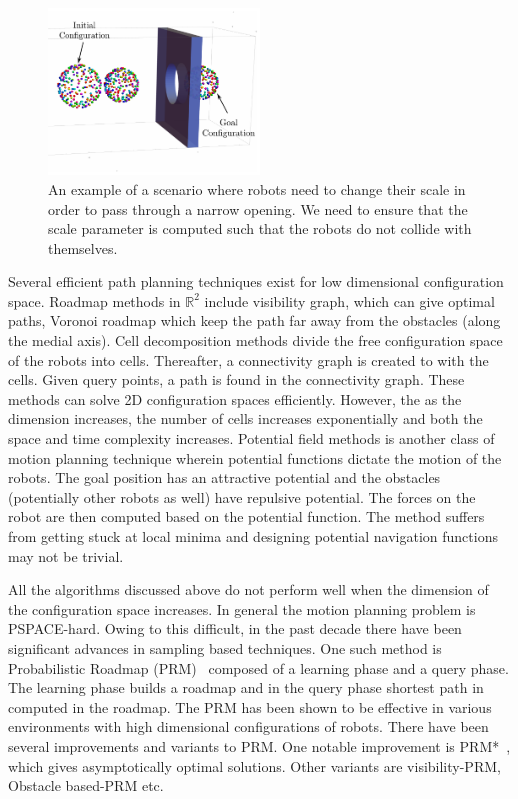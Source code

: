 \documentclass[12pt,a4paper, onecolumn]{IEEEtran}
\begin{document}
\begin{figure}[htbp]
  \centering
  \includegraphics[width=0.5\textwidth]{r200_all}
  \caption{An example of a scenario where robots need to change their scale in order to
  pass through a narrow opening. We need to ensure that the scale parameter is computed
  such that the robots do not collide with
themselves.}
  \label{fig:r200}
\end{figure}


Several efficient path planning techniques exist for low dimensional configuration space. Roadmap methods in $\mathbb R^2$ include visibility graph, which can give optimal paths, Voronoi
roadmap which keep the path far away from the obstacles (along the medial axis). Cell
decomposition methods divide the free configuration space of the robots into cells.
Thereafter, a connectivity graph is created to with the cells. Given query points, a path
is found in the connectivity graph. These methods can solve 2D configuration spaces
efficiently. However, the as the dimension increases, the number of cells increases
exponentially and both the space and time complexity increases. Potential field methods is
another class of motion planning technique wherein potential functions dictate the
motion of the robots. The goal position has an attractive potential and the obstacles
(potentially other robots as well) have repulsive potential. The forces on the robot are
then computed based on the potential function. The method suffers from getting stuck at
local minima and designing potential navigation functions may not be trivial. 

All the algorithms discussed above do not perform well when the dimension of the
configuration space increases. In general the motion planning problem is PSPACE-hard.
Owing to this difficult, in the past decade there have been significant advances in
sampling based techniques. One such method is Probabilistic Roadmap
(PRM)~\cite{kavrakiSLO96} composed of a
learning phase and a query phase. The learning phase builds a roadmap and in the query
phase shortest path in computed in the roadmap. The PRM has been shown to be effective in
various environments with high dimensional configurations of robots. There have been
several improvements and variants to PRM. One notable improvement is
PRM*~\cite{karmanF11IJRR}, which gives asymptotically optimal solutions. Other variants
are visibility-PRM, Obstacle based-PRM etc.
\end{document}
